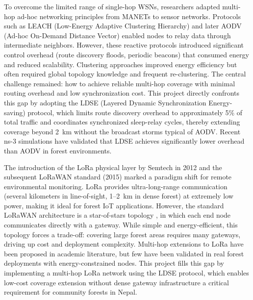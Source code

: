 To overcome the limited range of single-hop WSNs, researchers adapted multi-hop ad-hoc networking principles from MANETs to sensor networks. Protocols such as LEACH (Low-Energy Adaptive Clustering Hierarchy) and later AODV (Ad-hoc On-Demand Distance Vector)\cite{li2025ldse} enabled nodes to relay data through intermediate neighbors. However, these reactive protocols introduced significant control overhead (route discovery floods, periodic beacons) that consumed energy and reduced scalability. Clustering approaches improved energy efficiency but often required global topology knowledge and frequent re-clustering. The central challenge remained: how to achieve reliable multi-hop coverage with minimal routing overhead and low synchronization cost. This project directly confronts this gap by adopting the LDSE (Layered Dynamic Synchronization Energy-saving) protocol, which limits route discovery overhead to approximately 5\% of total traffic and coordinates synchronized sleep-relay cycles, thereby extending coverage beyond 2\, km without the broadcast storms typical of AODV. Recent ns-3 simulations have validated that LDSE achieves significantly lower overhead than AODV in forest environments.

The introduction of the LoRa physical layer by Semtech in 2012 \cite{semtech2026lora} and the subsequent LoRaWAN standard (2015) \cite{lorawan2015spec} marked a paradigm shift for remote environmental monitoring. LoRa provides ultra-long-range communication (several kilometers in line-of-sight, 1–2\, km in dense forest) at extremely low power, making it ideal for forest IoT applications. However, the standard LoRaWAN architecture is a star-of-stars topology \cite{haxhibeqiri2018survey}, in which each end node communicates directly with a gateway. While simple and energy-efficient, this topology forces a trade-off: covering large forest areas requires many gateways, driving up cost and deployment complexity. Multi-hop extensions to LoRa have been proposed in academic literature, but few have been validated in real forest deployments with energy-constrained nodes. This project fills this gap by implementing a multi-hop LoRa network using the LDSE protocol, which enables low-cost coverage extension without dense gateway infrastructure a critical requirement for community forests in Nepal.

